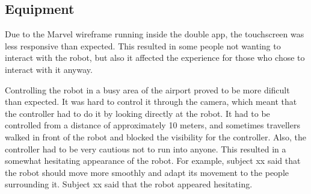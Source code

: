 \subsection{Equipment}
Due to the Marvel wireframe running inside the double app, the touchscreen was less responsive than expected. This resulted in some people not wanting to interact with the robot, but also it affected the experience for those who chose to interact with it anyway.

Controlling the robot in a busy area of the airport proved to be more dificult than expected. It was hard to control it through the camera, which meant that the controller had to do it by looking directly at the robot. It had to be controlled from a distance of approximately 10 meters, and sometimes travellers walked in front of the robot and blocked the visibility for the controller. Also, the controller had to be very cautious not to run into anyone. This resulted in a somewhat hesitating appearance of the robot. For example, subject xx said that the robot should move more smoothly and adapt its movement to the people surrounding it. Subject xx said that the robot appeared hesitating.